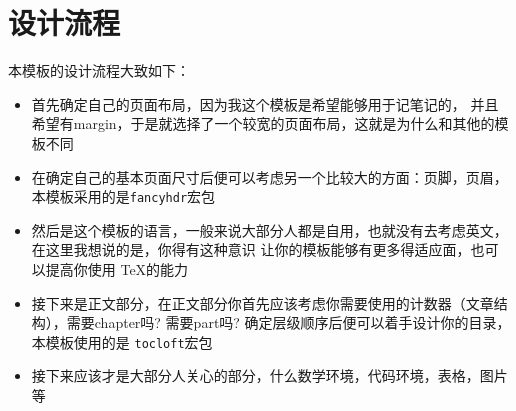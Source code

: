 \section{设计流程}
本模板的设计流程大致如下：
\begin{itemize}
    \item 首先确定自己的页面布局，因为我这个模板是希望能够用于记笔记的，
        并且希望有margin，于是就选择了一个较宽的页面布局，这就是为什么和其他的模板不同
    \item 在确定自己的基本页面尺寸后便可以考虑另一个比较大的方面：页脚，页眉，本模板采用的是\verb|fancyhdr|宏包
    \item 然后是这个模板的语言，一般来说大部分人都是自用，也就没有去考虑英文，在这里我想说的是，你得有这种意识
        让你的模板能够有更多得适应面，也可以提高你使用 \TeX{}的能力
    \item 接下来是正文部分，在正文部分你首先应该考虑你需要使用的计数器（文章结构），需要chapter吗? 需要part吗?
        确定层级顺序后便可以着手设计你的目录，本模板使用的是 \verb|tocloft|宏包
    \item 接下来应该才是大部分人关心的部分，什么数学环境，代码环境，表格，图片等
\end{itemize}
